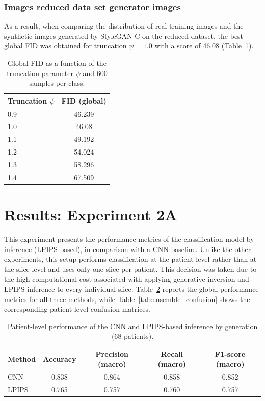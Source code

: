\subsubsection{Images reduced data set generator images}

As a result, when comparing the distribution of real training images and the synthetic images generated by StyleGAN-C on the reduced dataset, the best global FID was obtained for truncation $\psi = 1.0$ with a score of 46.08 (Table~\ref{tab:fid_global_truncation}).


\begin{table}[H]
\centering
\caption{Global FID as a function of the truncation parameter $\psi$ and 600 samples per class.}
\label{tab:fid_global_truncation}
\begin{tabular}{lc}
\toprule
\textbf{Truncation $\psi$} & \textbf{FID (global)} \\
\midrule
0.9 & 46.239 \\
1.0 & 46.08 \\
1.1 & 49.192 \\
1.2 & 54.024 \\
1.3 & 58.296 \\
1.4 & 67.509 \\
\bottomrule
\end{tabular}
\end{table}

\clearpage
\section{Results: Experiment 2A}

This experiment presents the performance metrics of the classification model by inference (LPIPS based), in comparison with a CNN baseline. Unlike the other experiments, this setup performs classification at the patient level rather than at the slice level and uses only one slice per patient. This decision was taken due to the high computational cost associated with applying generative inversion and LPIPS  inference to every individual slice. Table~\ref{tab:ensemble_overall} reports the global performance metrics for all three methods, while Table~\ref{tab:ensemble_confusion} shows the corresponding patient-level confusion matrices.

\begin{table}[H]
\centering
\caption{Patient-level performance of the CNN and LPIPS-based inference by generation (68 patients).}
\label{tab:ensemble_overall}
\begin{tabular}{lcccc}
\toprule
Method & Accuracy & Precision (macro) & Recall (macro) & F1-score (macro) \\
\midrule
CNN           & 0.838 & 0.864 & 0.858 & 0.852 \\
LPIPS        & 0.765 & 0.757 & 0.760 & 0.757 \\
\bottomrule
\end{tabular}
\end{table}


